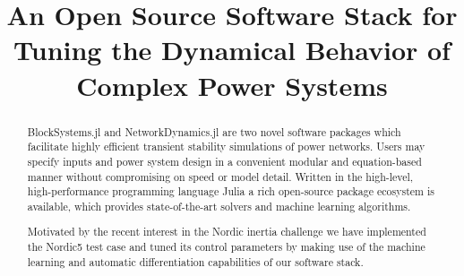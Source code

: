\documentclass[conference]{IEEEtran}
\begin{document}
\title{An Open Source Software Stack for Tuning the Dynamical Behavior of Complex Power Systems}

\author{
 }


\maketitle

\begin{abstract}

BlockSystems.jl and NetworkDynamics.jl are two novel software packages which facilitate highly efficient transient stability simulations of power networks. Users may specify inputs and power system design in a convenient modular and equation-based manner without compromising on speed or model detail.
Written in the high-level, high-performance programming language Julia\cite{Julia-2017} a rich open-source package ecosystem is available, which provides state-of-the-art solvers and machine learning algorithms\cite{SciML}.

Motivated by the recent interest in the Nordic inertia challenge \cite{inertia_challenge} we have implemented the Nordic5 test case \cite{hydro_and_wind} and tuned its control parameters by making use of the machine learning and automatic differentiation capabilities of our software stack.
\end{abstract}
\end{document}
